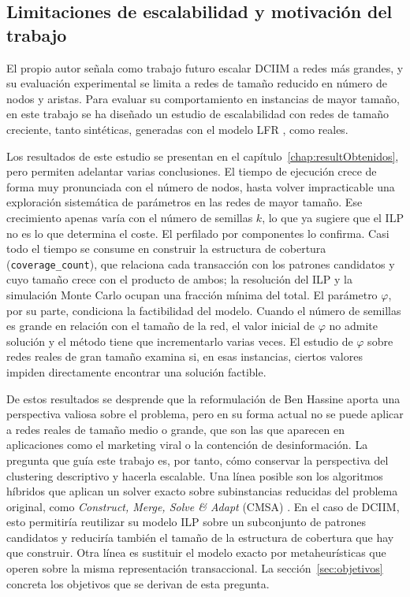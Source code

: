\subsection{Limitaciones de escalabilidad y motivación del trabajo} \label{subsec:motivacion}

El propio autor señala como trabajo futuro escalar DCIIM a redes más grandes, y su evaluación experimental se limita a redes de tamaño reducido en número de nodos y aristas.
Para evaluar su comportamiento en instancias de mayor tamaño, en este trabajo se ha diseñado un estudio de escalabilidad con redes de tamaño creciente, tanto sintéticas, generadas con el modelo LFR \cite{lancichinetti2008benchmark}, como reales.

Los resultados de este estudio se presentan en el capítulo~\ref{chap:resultObtenidos}, pero permiten adelantar varias conclusiones.
El tiempo de ejecución crece de forma muy pronunciada con el número de nodos, hasta volver impracticable una exploración sistemática de parámetros en las redes de mayor tamaño.
Ese crecimiento apenas varía con el número de semillas $k$, lo que ya sugiere que el ILP no es lo que determina el coste.
El perfilado por componentes lo confirma.
Casi todo el tiempo se consume en construir la estructura de cobertura (\texttt{coverage\_count}), que relaciona cada transacción con los patrones candidatos y cuyo tamaño crece con el producto de ambos; la resolución del ILP y la simulación Monte Carlo ocupan una fracción mínima del total.
El parámetro $\varphi$, por su parte, condiciona la factibilidad del modelo.
Cuando el número de semillas es grande en relación con el tamaño de la red, el valor inicial de $\varphi$ no admite solución y el método tiene que incrementarlo varias veces.
El estudio de $\varphi$ sobre redes reales de gran tamaño examina si, en esas instancias, ciertos valores impiden directamente encontrar una solución factible.

De estos resultados se desprende que la reformulación de Ben Hassine aporta una perspectiva valiosa sobre el problema, pero en su forma actual no se puede aplicar a redes reales de tamaño medio o grande, que son las que aparecen en aplicaciones como el marketing viral o la contención de desinformación.
La pregunta que guía este trabajo es, por tanto, cómo conservar la perspectiva del clustering descriptivo y hacerla escalable.
Una línea posible son los algoritmos híbridos que aplican un solver exacto sobre subinstancias reducidas del problema original, como \textit{Construct, Merge, Solve \& Adapt} (CMSA) \cite{blum2024cmsa}.
En el caso de DCIIM, esto permitiría reutilizar su modelo ILP sobre un subconjunto de patrones candidatos y reduciría también el tamaño de la estructura de cobertura que hay que construir.
Otra línea es sustituir el modelo exacto por metaheurísticas que operen sobre la misma representación transaccional.
La sección~\ref{sec:objetivos} concreta los objetivos que se derivan de esta pregunta.

